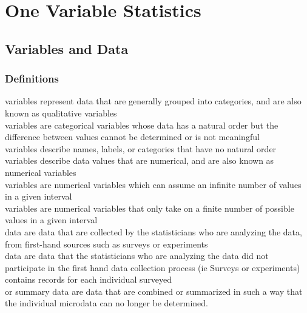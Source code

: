 \chapter{One Variable Statistics}
\section{Variables and Data}
\subsection{Definitions}

 variables represent data that are generally grouped into categories, and are also known as qualitative variables\\

 variables are categorical variables whose data has a natural order but the difference between values cannot be determined
or is not meaningful\\

 variables describe names, labels, or categories that have no natural order\\

 variables describe data values that are numerical, and are also known as numerical variables\\

 variables are numerical variables which can assume an infinite number of values in a given interval\\

 variables are numerical variables that only take on a finite number of possible values in a given interval\\

 data are data that are collected by the statisticians who are analyzing the data, from first-hand sources such as surveys or 
experiments\\

 data are data that the statisticians who are analyzing the data did not participate in the first hand data collection 
process (ie Surveys or experiments)\\

 contains records for each individual surveyed\\

 or summary data are data that are combined or summarized in such a way that the individual microdata can no longer be 
determined.\\

